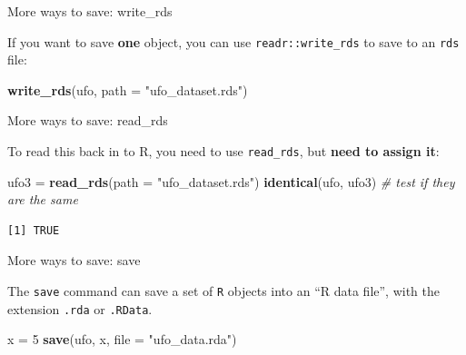 \documentclass[
  ignorenonframetext,
]{beamer}
\newenvironment{Shaded}{\begin{snugshade}}{\end{snugshade}}
\newcommand{\CommentTok}[1]{\textcolor[rgb]{0.56,0.35,0.01}{\textit{#1}}}
\newcommand{\DataTypeTok}[1]{\textcolor[rgb]{0.13,0.29,0.53}{#1}}
\newcommand{\DecValTok}[1]{\textcolor[rgb]{0.00,0.00,0.81}{#1}}
\newcommand{\KeywordTok}[1]{\textcolor[rgb]{0.13,0.29,0.53}{\textbf{#1}}}
\newcommand{\NormalTok}[1]{#1}
\newcommand{\StringTok}[1]{\textcolor[rgb]{0.31,0.60,0.02}{#1}}
\begin{document}
\begin{frame}[fragile]{More ways to save: write\_rds}
\protect\hypertarget{more-ways-to-save-write_rds}{}

If you want to save \textbf{one} object, you can use
\texttt{readr::write\_rds} to save to an \texttt{rds} file:

\begin{Shaded}
\begin{Highlighting}[]
\KeywordTok{write_rds}\NormalTok{(ufo, }\DataTypeTok{path =} \StringTok{"ufo_dataset.rds"}\NormalTok{)}
\end{Highlighting}
\end{Shaded}

\end{frame}

\begin{frame}[fragile]{More ways to save: read\_rds}
\protect\hypertarget{more-ways-to-save-read_rds}{}

To read this back in to R, you need to use \texttt{read\_rds}, but
\textbf{need to assign it}:

\begin{Shaded}
\begin{Highlighting}[]
\NormalTok{ufo3 =}\StringTok{ }\KeywordTok{read_rds}\NormalTok{(}\DataTypeTok{path =} \StringTok{"ufo_dataset.rds"}\NormalTok{)}
\KeywordTok{identical}\NormalTok{(ufo, ufo3) }\CommentTok{# test if they are the same }
\end{Highlighting}
\end{Shaded}

\begin{verbatim}
[1] TRUE
\end{verbatim}

\end{frame}

\begin{frame}[fragile]{More ways to save: save}
\protect\hypertarget{more-ways-to-save-save}{}

The \texttt{save} command can save a set of \texttt{R} objects into an
``R data file'', with the extension \texttt{.rda} or \texttt{.RData}.

\begin{Shaded}
\begin{Highlighting}[]
\NormalTok{x =}\StringTok{ }\DecValTok{5}
\KeywordTok{save}\NormalTok{(ufo, x, }\DataTypeTok{file =} \StringTok{"ufo_data.rda"}\NormalTok{)}
\end{Highlighting}
\end{Shaded}

\end{frame}
\end{document}
